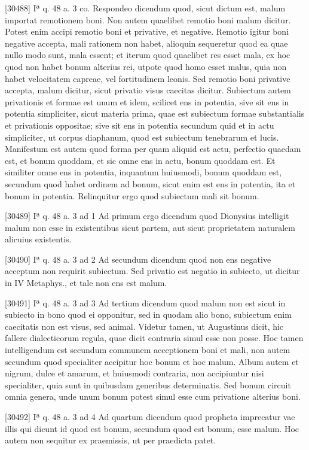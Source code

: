 \documentclass[paper=a4paper,fontsize=10pt,jafontsize=9pt,titlepage]{jlreq}
\begin{document}
[30488] Iª q. 48 a. 3 co. Respondeo dicendum quod, sicut dictum est, malum importat remotionem boni. Non autem quaelibet remotio boni malum dicitur. Potest enim accipi remotio boni et privative, et negative. Remotio igitur boni negative accepta, mali rationem non habet, alioquin sequeretur quod ea quae nullo modo sunt, mala essent; et iterum quod quaelibet res esset mala, ex hoc quod non habet bonum alterius rei, utpote quod homo esset malus, quia non habet velocitatem capreae, vel fortitudinem leonis. Sed remotio boni privative accepta, malum dicitur, sicut privatio visus caecitas dicitur. Subiectum autem privationis et formae est unum et idem, scilicet ens in potentia, sive sit ens in potentia simpliciter, sicut materia prima, quae est subiectum formae substantialis et privationis oppositae; sive sit ens in potentia secundum quid et in actu simpliciter, ut corpus diaphanum, quod est subiectum tenebrarum et lucis. Manifestum est autem quod forma per quam aliquid est actu, perfectio quaedam est, et bonum quoddam, et sic omne ens in actu, bonum quoddam est. Et similiter omne ens in potentia, inquantum huiusmodi, bonum quoddam est, secundum quod habet ordinem ad bonum, sicut enim est ens in potentia, ita et bonum in potentia. Relinquitur ergo quod subiectum mali sit bonum.

[30489] Iª q. 48 a. 3 ad 1 Ad primum ergo dicendum quod Dionysius intelligit malum non esse in existentibus sicut partem, aut sicut proprietatem naturalem alicuius existentis.

[30490] Iª q. 48 a. 3 ad 2 Ad secundum dicendum quod non ens negative acceptum non requirit subiectum. Sed privatio est negatio in subiecto, ut dicitur in IV Metaphys., et tale non ens est malum.

[30491] Iª q. 48 a. 3 ad 3 Ad tertium dicendum quod malum non est sicut in subiecto in bono quod ei opponitur, sed in quodam alio bono, subiectum enim caecitatis non est visus, sed animal. Videtur tamen, ut Augustinus dicit, hic fallere dialecticorum regula, quae dicit contraria simul esse non posse. Hoc tamen intelligendum est secundum communem acceptionem boni et mali, non autem secundum quod specialiter accipitur hoc bonum et hoc malum. Album autem et nigrum, dulce et amarum, et huiusmodi contraria, non accipiuntur nisi specialiter, quia sunt in quibusdam generibus determinatis. Sed bonum circuit omnia genera, unde unum bonum potest simul esse cum privatione alterius boni.

[30492] Iª q. 48 a. 3 ad 4 Ad quartum dicendum quod propheta imprecatur vae illis qui dicunt id quod est bonum, secundum quod est bonum, esse malum. Hoc autem non sequitur ex praemissis, ut per praedicta patet.
\end{document}
